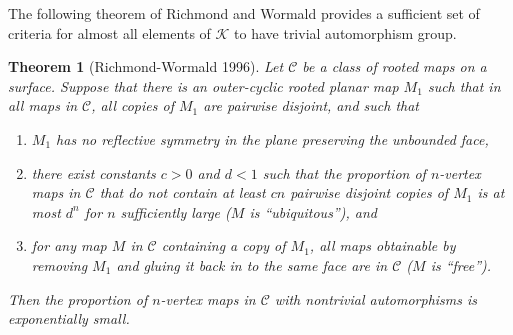 \documentclass[amsmath,longbibliography,secnumarabic,floatfix,amssymb,nofootinbib,nobibnotes,letterpaper,11pt,notitlepage,preprint]{revtex4-1}
\newcommand{\FlatKnotDia}{\mathscr{K}}
\newtheorem{theorem}{Theorem} \newtheorem{corollary}[theorem]{Corollary}
\begin{document}
The following theorem of Richmond and Wormald \cite{Richmond19951} provides a sufficient set of
criteria for almost all elements of $\FlatKnotDia$ to have trivial automorphism group.
\begin{theorem}[Richmond-Wormald 1996]
  Let $\mathscr C$ be a class of rooted maps on a surface. Suppose that there is an outer-cyclic
  rooted planar map $M_1$ such that in all maps in $\mathscr C$, all copies of $M_1$ are pairwise
  disjoint, and such that
  \begin{enumerate}
  \item $M_1$ has no reflective symmetry in the plane preserving the unbounded face,
  \item there exist constants $c > 0$ and $d < 1$ such that the proportion of $n$-vertex maps in
    $\mathscr C$ that do not contain at least $cn$ pairwise disjoint copies of $M_1$ is at most
    $d^n$ for $n$ sufficiently large ($M$ is ``ubiquitous''), and
  \item for any map $M$ in $\mathscr C$ containing a copy of $M_1$, all maps obtainable by removing
    $M_1$ and gluing it back in to the same face are in $\mathscr C$ ($M$ is ``free'').
  \end{enumerate}
  Then the proportion of $n$-vertex maps in $\mathscr C$ with nontrivial automorphisms is
  exponentially small.
\end{theorem}
\end{document}

